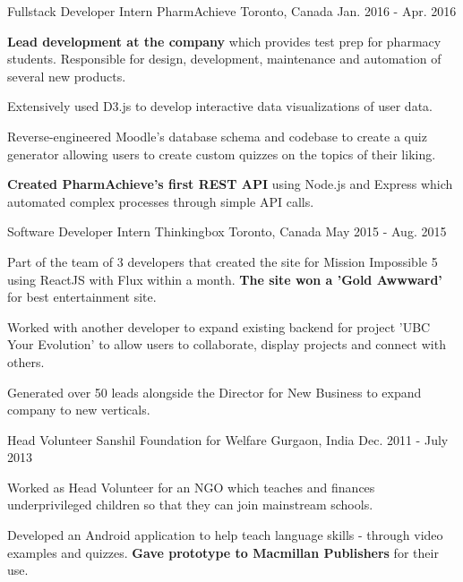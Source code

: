 \begin{cventries}
  \cventry
    {Fullstack Developer Intern}
    {PharmAchieve}
    {Toronto, Canada}
    {Jan. 2016 -  Apr. 2016}
    {
      \begin{cvitems}
        \item {\textbf{Lead development at the company} which provides test prep for pharmacy students. Responsible for design, development, maintenance and automation of several new products.}
        \item {Extensively used D3.js to develop interactive data visualizations of user data.}
        \item {Reverse-engineered Moodle's database schema and codebase to create a quiz generator allowing users to create custom quizzes on the topics of their liking. }
        \item {\textbf{Created PharmAchieve's first REST API} using Node.js and Express which automated complex processes through simple API calls. }
      \end{cvitems}
    }
  \cventry
    {Software Developer Intern}
    {Thinkingbox}
    {Toronto, Canada}
    {May 2015 - Aug. 2015}
    {
      \begin{cvitems}
        \item {Part of the team of 3 developers that created the site for Mission Impossible 5 using ReactJS with Flux within a month. \textbf{The site won a 'Gold Awwward'} for best entertainment site.}
        \item {Worked with another developer to expand existing backend for project 'UBC Your Evolution' to allow users to collaborate, display projects and connect with others.}
       \item {Generated over 50 leads alongside the Director for New Business to expand company to new verticals.}
      \end{cvitems}
    }
  \cventry
    {Head Volunteer}
    {Sanshil Foundation for Welfare}
    {Gurgaon, India}
    {Dec. 2011 - July 2013}
    {
      \begin{cvitems}
        \item {Worked as Head Volunteer for an NGO which teaches and finances underprivileged children so that they can join mainstream schools.}
        \item {Developed an Android application to help teach language skills - through video examples and quizzes. \textbf{Gave prototype to Macmillan Publishers} for their use.}
      \end{cvitems} 
    }
\end{cventries}
